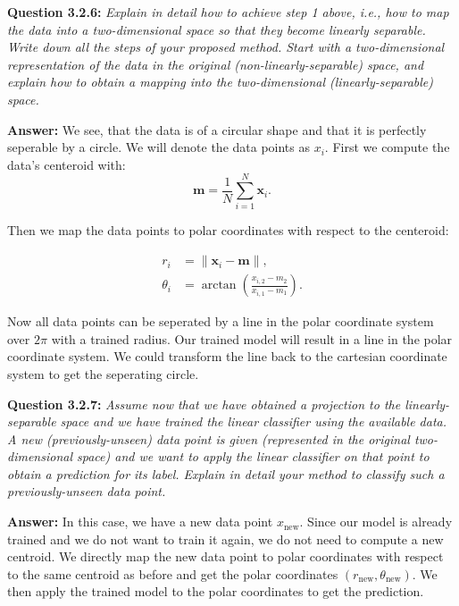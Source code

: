 \documentclass{article}
\begin{document}
\begin{multicols}{2}
    \noindent \textbf{Question 3.2.6:}  
    \textit{Explain in detail how to achieve step 1 above, i.e., how to map the data into a two-dimensional space so that they become linearly separable. Write down all the steps of your proposed method. Start with a two-dimensional representation of the data in the original (non-linearly-separable) space, and explain how to obtain a mapping into the two-dimensional (linearly-separable) space.}
    
    \textbf{Answer:}
    We see, that the data is of a circular shape and that it is perfectly seperable by a circle. We will denote the data points as $x_i$. First we compute the data's centeroid with:
    \begin{equation*}
        \mathbf{m} = \frac{1}{N} \sum_{i=1}^N \mathbf{x}_i.
    \end{equation*}

    Then we map the data points to polar coordinates with respect to the centeroid:

    \begin{align*}
        r_i &= \|\mathbf{x}_i - \mathbf{m}\|, \\
        \theta_i &= \arctan\left(\frac{x_{i,2} - m_2}{x_{i,1} - m_1}\right).
    \end{align*}

    Now all data points can be seperated by a line in the polar coordinate system over $2\pi$ with a trained radius. Our trained model will result in a line in the polar coordinate system. We could transform the line back to the cartesian coordinate system to get the seperating circle.

    \vspace{0.5cm}
    \noindent \textbf{Question 3.2.7:}  
    \textit{Assume now that we have obtained a projection to the linearly-separable space and we have trained the linear classifier using the available data. A new (previously-unseen) data point is given (represented in the original two-dimensional space) and we want to apply the linear classifier on that point to obtain a prediction for its label. Explain in detail your method to classify such a previously-unseen data point.}
    
    \textbf{Answer:}
    In this case, we have a new data point \( x_{\text{new}} \). Since our model is already trained and we do not want to train it again, we do not need to compute a new centroid. We directly map the new data point to polar coordinates with respect to the same centroid as before and get the polar coordinates \( (r_{\text{new}}, \theta_{\text{new}}) \). We then apply the trained model to the polar coordinates to get the prediction.


\end{multicols}
\end{document}
